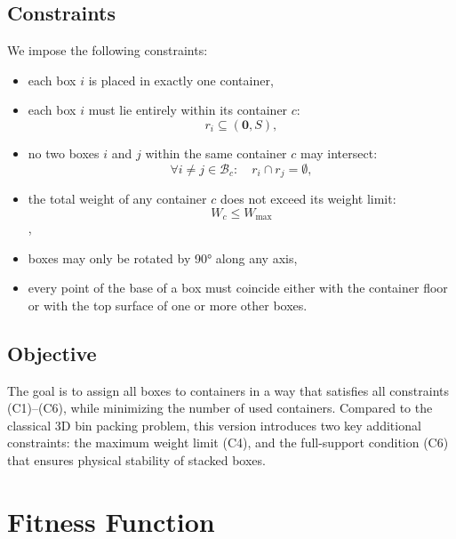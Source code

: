 \subsection*{Constraints}

We impose the following constraints:

\begin{itemize}
    \item[\textbf{(C1)}] each box $i$ is placed in exactly one container,
    
    \item[\textbf{(C2)}] each box $i$ must lie entirely within its container $c$:
         \[r_i \subseteq (\mathbf{0}, S),\]
    
    \item[\textbf{(C3)}] no two boxes $i$ and $j$ within the same container $c$ may intersect:
    \[
    \forall i \neq j \in \mathcal{B}_c: \quad r_i \cap r_j = \emptyset,
    \]
    
    \item[\textbf{(C4)}] the total weight of any container $c$ does not exceed its weight limit:
    \[
    W_c \leq W_\text{max}
    \],
    
    \item[\textbf{(C5)}] boxes may only be rotated by 90° along any axis,
    
    \item[\textbf{(C6)}] every point of the base of a box must coincide either with the container floor or with the top surface of one or more other boxes.
\end{itemize}

\subsection*{Objective}

The goal is to assign all boxes to containers in a way that satisfies all constraints (C1)--(C6), while minimizing the number of used containers.
Compared to the classical 3D bin packing problem, this version introduces two key additional constraints: the maximum weight limit (C4), 
and the full-support condition (C6) that ensures physical stability of stacked boxes.




\section{Fitness Function}
\label{sec:fitness-function}

